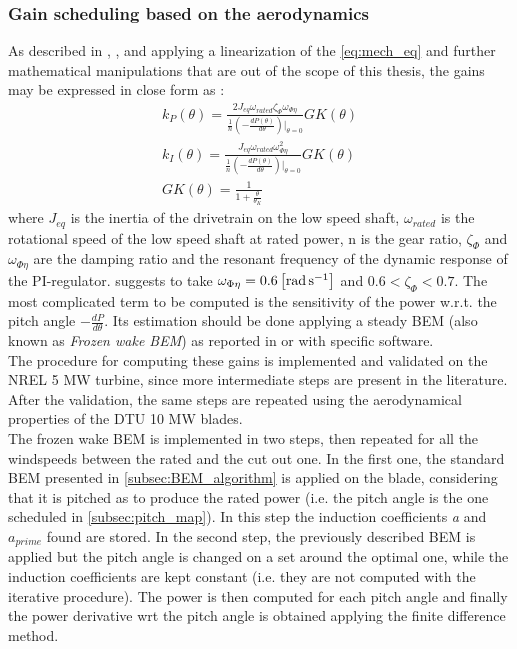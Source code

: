 \subsubsection{Gain scheduling based on the aerodynamics}\label{subsec:gain_schdeuling_NREL5MW}

As described in \cite{Aerodynamics_of_wind_turbines}, \cite{NREL_5MW_reference}, and \cite{ris_r_1500} applying a linearization of the \autoref{eq:mech_eq} and further mathematical manipulations that are out of the scope of this thesis,  the gains may be expressed in close form as :
\begin{gather}
    k_P(\theta) = \frac{2J_{eq}\omega_{rated}\zeta_{\Phi}\omega_{\Phi\eta}}{\frac{1}{n}\left(-\frac{dP(\theta)}{d\theta}\right)\vert_{\theta=0}}GK(\theta)
    \label{eq:kp}\\
    k_I(\theta) = \frac{J_{eq}\omega_{rated}\omega_{\Phi\eta}^2}{\frac{1}{n}\left(-\frac{dP(\theta)}{d\theta}\right)\vert_{\theta=0}}GK(\theta)
    \label{eq:ki}\\
    GK(\theta) = \frac{1}{1+\frac{\theta}{\theta_K}} \label{eq:GK}
\end{gather}
where $J_{eq}$ is the inertia of the drivetrain on the low speed shaft, $\omega_{rated}$ is the rotational speed of the low speed shaft at rated power, n is the gear ratio, $\zeta_{\Phi}$ and $\omega_{\Phi\eta}$ are the damping ratio and the resonant frequency of the dynamic response of the PI-regulator. \cite{NREL_5MW_reference} suggests to take $\omega_{\Phi\eta}=0.6\left[\si{\radian\per\second}\right]$ and $0.6<\zeta_{\Phi}<0.7$. The most complicated term to be computed is the sensitivity of the power w.r.t. the pitch angle $-\frac{dP}{d\theta}$. Its estimation should be done applying a steady \acrshort{BEM} (also known as \textit{Frozen wake BEM}) as reported in \cite{Aerodynamics_of_wind_turbines} or with specific software. \\
The procedure for computing these gains is implemented and validated on the NREL 5 MW turbine, since more intermediate steps are present in the literature. After the validation, the same steps are repeated using the aerodynamical properties of the DTU 10 MW blades. \\
The frozen wake BEM is implemented in two steps, then repeated for all the windspeeds between the rated and the cut out one. In the first one, the standard BEM presented in \autoref{subsec:BEM_algorithm} is applied on the blade, considering that it is pitched as to produce the rated power (i.e. the pitch angle is the one scheduled in \autoref{subsec:pitch_map}). In this step the induction coefficients \textit{a} and \textit{$a_{prime}$} found are stored. In the second step, the previously described BEM is applied but the pitch angle is changed on a set around the optimal one, while the induction coefficients are kept constant (i.e. they are not computed with the iterative procedure). The power is then computed for each pitch angle and finally the power derivative wrt the pitch angle is obtained applying the finite difference method.

